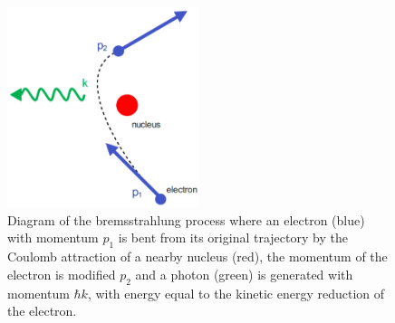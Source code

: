 \documentclass[../main.tex]{subfiles}
\begin{document}
\begin{figure}[!h]
\centering
\includegraphics[width=0.5\textwidth]{Figures/DIANA_Inverse_Compton_Source_Design/Bremsstrahlung_fixed.pdf}
\caption{Diagram of the bremsstrahlung process where an electron (blue) with momentum $p_{1}$ is bent from its original trajectory by the Coulomb attraction of a nearby nucleus (red), the momentum of the electron is modified $p_{2}$ and a photon (green) is generated with momentum $\hbar k$, with energy equal to the kinetic energy reduction of the electron.}
\label{fig:bremsstrahlung_diagram}
\end{figure}
\end{document}
